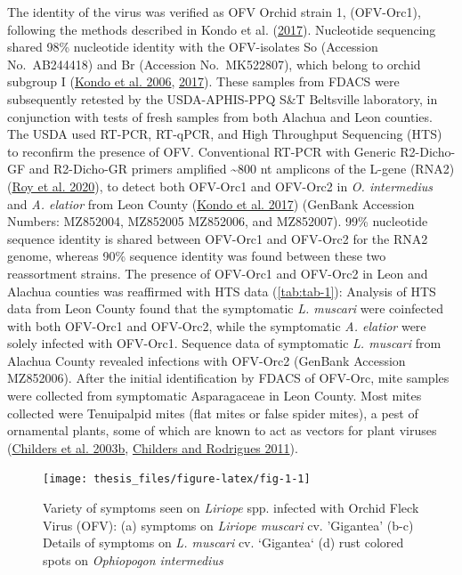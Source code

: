 \documentclass{ufdissertation}[overrideChapters] %
\begin{document}
{The identity of the virus was verified as OFV Orchid strain 1, (OFV-Orc1), following the methods described in Kondo et al. (\protect\hyperlink{ref-Kondo2017}{2017}). Nucleotide sequencing shared 98\% nucleotide identity with the OFV-isolates So (Accession No.~AB244418) and Br (Accession No.~MK522807), which belong to orchid subgroup I (\protect\hyperlink{ref-Kondo2006}{Kondo et al. 2006}, \protect\hyperlink{ref-Kondo2017}{2017}). These samples from FDACS were subsequently retested by the USDA-APHIS-PPQ S\&T Beltsville laboratory, in conjunction with tests of fresh samples from both Alachua and Leon counties. The USDA used RT-PCR, RT-qPCR, and High Throughput Sequencing (HTS) to reconfirm the presence of OFV. Conventional RT-PCR with Generic R2-Dicho-GF and R2-Dicho-GR primers amplified \textasciitilde800 nt amplicons of the L-gene (RNA2) (\protect\hyperlink{ref-Roy2020}{Roy et al. 2020}), to detect both OFV-Orc1 and OFV-Orc2 in \emph{O. intermedius} and \emph{A. elatior} from Leon County (\protect\hyperlink{ref-Kondo2017}{Kondo et al. 2017}) (GenBank Accession Numbers: MZ852004, MZ852005 MZ852006, and MZ852007). 99\% nucleotide sequence identity is shared between OFV-Orc1 and OFV-Orc2 for the RNA2 genome, whereas 90\% sequence identity was found between these two reassortment strains. The presence of OFV-Orc1 and OFV-Orc2 in Leon and Alachua counties was reaffirmed with HTS data (\ref{tab:tab-1}): Analysis of HTS data from Leon County found that the symptomatic \emph{L. muscari} were coinfected with both OFV-Orc1 and OFV-Orc2, while the symptomatic \emph{A. elatior} were solely infected with OFV-Orc1. Sequence data of symptomatic \emph{L. muscari} from Alachua County revealed infections with OFV-Orc2 (GenBank Accession MZ852006). After the initial identification by FDACS of OFV-Orc, mite samples were collected from symptomatic Asparagaceae in Leon County. Most mites collected were Tenuipalpid mites (flat mites or false spider mites), a pest of ornamental plants, some of which are known to act as vectors for plant viruses (\protect\hyperlink{ref-Childers2003}{Childers et al. 2003b}, \protect\hyperlink{ref-Childers2011}{Childers and Rodrigues 2011}).
\begin{figure}

{\centering \texttt{[image: thesis\_files/figure-latex/fig-1-1]} 

}

\caption[Variety of symptoms seen on \textit{Liriope} spp. infected with Orchid Fleck Virus]{Variety of symptoms seen on \textit{Liriope} spp. infected with Orchid Fleck Virus (OFV): (a) symptoms on \textit{Liriope muscari} cv. 'Gigantea' (b-c) Details of symptoms on \textit{L. muscari} cv. `Gigantea` (d) rust colored spots on \textit{Ophiopogon intermedius}}\label{fig:fig-1}
\end{figure}
\begin{figure}


\end{figure}}
\end{document}
